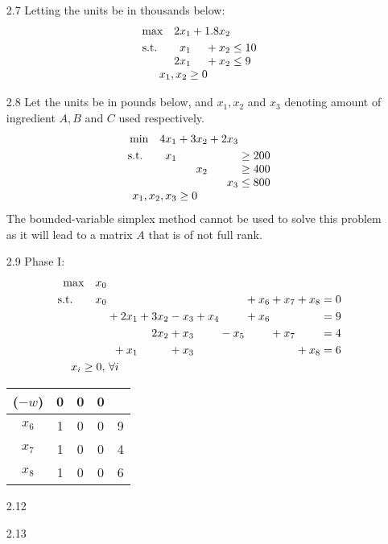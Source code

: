 \documentclass[a4paper,10pt]{article}
\theoremstyle{definition}
\begin{document}
\begin{enumerate}
\item[2.7]
Letting the units be in thousands below: 
\begin{align*}
  \begin{array}{r@{}r@{}l}
    \text{max} \quad 2x_1 &{}+ 1.8x_2 \\[\jot]
    \text{s.t.}\qquad x_1 &{}+ x_2&{} \leq 10 \\
    2x_1 &{}+ x_2&{} \leq 9 \\
     \multicolumn{2}{c}{x_1, x_2 \geq 0}
  \end{array}
\end{align*}
\item[2.8]
Let the units be in pounds below, and $x_1, x_2$ and $x_3$ denoting amount of ingredient $A, B$ and $C$ used respectively.
\begin{align*}
  \begin{array}{r@{}r@{}r@{}l}
    \text{min} \quad 4x_1 &{}+ 3x_2&{}+2x_3 \\[\jot]
    \text{s.t.}\qquad x_1 &{}&{}&{} \geq 200 \\
    &{}x_2&{}&{} \geq 400 \\
   &{}&{}x_3&{} \leq 800 \\ 
     \multicolumn{2}{c}{x_1, x_2 , x_3 \geq 0}
  \end{array}
\end{align*}
The bounded-variable simplex method cannot be used to solve this problem as it will lead to a matrix $A$ that is of not full rank.
\item[2.9]
Phase I:
\begin{align*}
  \begin{array}{r@{}r@{}r@{}r@{}r@{}r@{}r@{}r@{}r@{}l}
    \text{max} \quad x_0 &{}&{}\\[\jot]
    \text{s.t.}\qquad x_0 &{}&{}&{}&{}&{}&{}+x_6&{}+x_7&{}+x_8&{}=0\\[\jot]
    &{}+2x_1 &{}+3x_2&{}-x_3&{}+x_4 &{} &{} +x_6 &{} &{}&{}=9  \\[\jot]
    &{}&{}2x_2&{}+x_3&{} &{}-x_5 &{} &{}+x_7&{}&{} = 4 \\[\jot]
   &{}+x_1&{}&{}+x_3&{} &{}&{} &{}&{}+x_8&{}= 6 \\ [\jot]
     \multicolumn{2}{c}{x_i \geq 0,\, \forall i}
  \end{array}
\end{align*}
\begin{table}[h]
\centering
\begin{tabular}{c|ccc|c}
($-w$) & 0 & 0 & 0 & \\
\hline
$x_6$ & 1 & 0 & 0 & 9\\
$x_7$ & 1 & 0 & 0 & 4\\
$x_8$ & 1 & 0 & 0 & 6\\
\end{tabular}
\end{table}
\item[2.12]
\item[2.13]
\end{enumerate}
\end{document}
